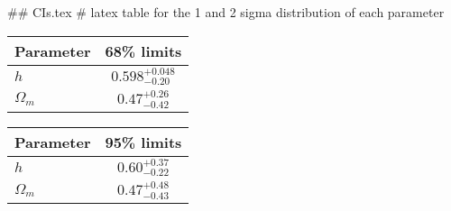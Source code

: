 ## CIs.tex
# latex table for the 1 and 2 sigma distribution of each parameter

\begin{tabular} { l  c}
 Parameter &  68\% limits\\
\hline
{\boldmath$h              $} & $0.598^{+0.048}_{-0.20}    $\\
{\boldmath$\Omega_m       $} & $0.47^{+0.26}_{-0.42}      $\\
\hline
\end{tabular}

\begin{tabular} { l  c}
 Parameter &  95\% limits\\
\hline
{\boldmath$h              $} & $0.60^{+0.37}_{-0.22}      $\\
{\boldmath$\Omega_m       $} & $0.47^{+0.48}_{-0.43}      $\\
\hline
\end{tabular}
